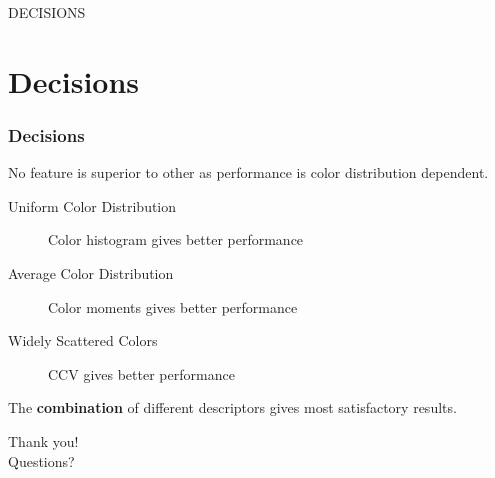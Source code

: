 \documentclass[9pt]{beamer}
\begin{document}
\begin{frame}
\fontsize{18pt}{30}\selectfont
\centering
DECISIONS
\end{frame}


\section{Decisions}
\begin{frame}
\frametitle{Decisions}
\pause
No feature is superior to other as performance is color distribution dependent.\\[\baselineskip]
\pause
\begin{description}
\item[Uniform Color Distribution] Color histogram gives better performance
\pause
\item[Average Color Distribution] Color moments gives better performance
\pause
\item[Widely Scattered Colors] CCV gives better performance\\[\baselineskip]
\end{description}
\pause
The \textbf{combination} of different descriptors gives most satisfactory results.
\end{frame}

\begin{frame}
\fontsize{18pt}{30}\selectfont
\centering
Thank you!\\[\baselineskip]
\pause
Questions?
\end{frame}
\end{document}
